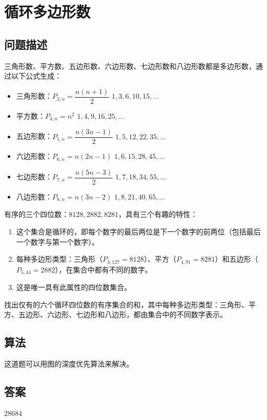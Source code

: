 \section{循环多边形数}\label{sec:problem61}
\subsection{问题描述}
\begin{tcolorbox}
	三角形数、平方数、五边形数、六边形数、七边形数和八边形数都是多边形数，通过以下公式生成：

	\begin{itemize}
		\item 三角形数：$P_{3,n} = \dfrac{n(n+1)}{2}$ \quad $1, 3, 6, 10, 15, \dots$
		\item 平方数：$P_{4,n} = n^2$ \quad $1, 4, 9, 16, 25, \dots$
		\item 五边形数：$P_{5,n} = \dfrac{n(3n-1)}{2}$ \quad $1, 5, 12, 22, 35, \dots$
		\item 六边形数：$P_{6,n} = n(2n-1)$ \quad $1, 6, 15, 28, 45, \dots$
		\item 七边形数：$P_{7,n} = \dfrac{n(5n-3)}{2}$ \quad $1, 7, 18, 34, 55, \dots$
		\item 八边形数：$P_{8,n} = n(3n-2)$ \quad $1, 8, 21, 40, 65, \dots$
	\end{itemize}

	有序的三个四位数：$8128, 2882, 8281$，具有三个有趣的特性：

	\begin{enumerate}
		\item 这个集合是循环的，即每个数字的最后两位是下一个数字的前两位（包括最后一个数字与第一个数字）。
		\item 每种多边形类型：三角形（$P_{3,127} = 8128$）、平方（$P_{4,91} = 8281$）和五边形（$P_{5,44} = 2882$），在集合中都有不同的数字。
		\item 这是唯一具有此属性的四位数集合。
	\end{enumerate}

	找出仅有的六个循环四位数的有序集合的和，其中每种多边形类型：三角形、平方、五边形、六边形、七边形和八边形，都由集合中的不同数字表示。

\end{tcolorbox}

\subsection{算法}
这道题可以用图的深度优先算法来解决。

\subsection{答案}
28684
